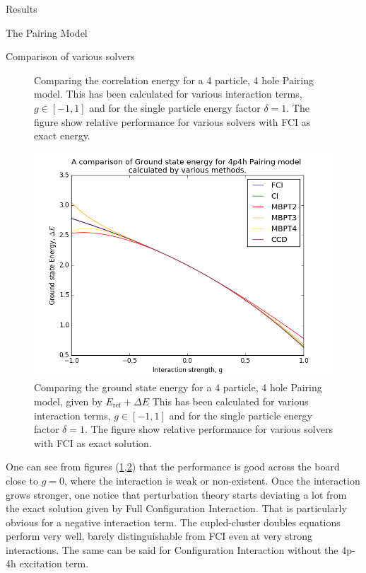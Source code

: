 \documentclass[twoside,english]{uiofysmaster}
\begin{document}
\begin{chapter}{Results}
\begin{section}{The Pairing Model}
\begin{subsection}{Comparison of various solvers}
\begin{figure}[]
				\caption{Comparing the correlation energy for a 4 particle, 4 hole Pairing model. This has been calculated for various interaction terms, $g \in [-1,1]$ and for the single particle energy factor $\delta = 1$. The figure show relative performance for various solvers with FCI as exact energy.}
				\label{figure:CompareCorrelationPairing}
			\end{figure}

			\begin{figure}[]
				\includegraphics[width=\linewidth]{../Pairing_Model/Results/Figures/Pairing4p4h_CompareE_AllMethods.png}
				\caption{Comparing the ground state energy for a 4 particle, 4 hole Pairing model, given by $E_{\text{ref}} + \Delta E$ This has been calculated for various interaction terms, $g \in [-1,1]$ and for the single particle energy factor $\delta = 1$. The figure show relative performance for various solvers with FCI as exact solution.}
				\label{figure:CompareEnergyPairing}
			\end{figure}
			One can see from figures (\ref{figure:CompareCorrelationPairing},\ref{figure:CompareEnergyPairing}) that the performance is good across the board close to $g = 0$, where the interaction is weak or non-existent. Once the interaction grows stronger, one notice that perturbation theory starts deviating a lot from the exact solution given by Full Configuration Interaction. That is particularly obvious for a negative interaction term. The cupled-cluster doubles equations perform very well, barely distinguishable from FCI even at very strong interactions. The same can be said for Configuration Interaction without the 4p-4h excitation term.  
		\end{subsection}


\end{section}
\end{chapter}
\end{document}
